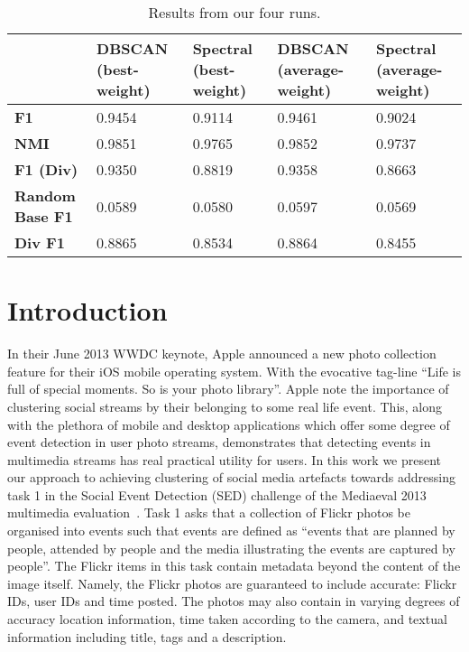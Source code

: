 \documentclass{../acm_proc_article-me11_tweaked}
\begin{document}
\begin{table*}[t!]
	\caption{\label{tab:results}Results from our four runs.}
\centering
    \begin{tabular}{|l||l|l|l|l|}
	\hline
    ~                  & \textbf{DBSCAN (best-weight)} &  \textbf{Spectral (best-weight)} & \textbf{DBSCAN (average-weight)} & \textbf{Spectral (average-weight)} \\
    \hline
    \hline
    \textbf{F1}                 & 0.9454        & 0.9114           & 0.9461           & 0.9024             \\
    \hline
    \textbf{NMI}                & 0.9851        & 0.9765           & 0.9852           & 0.9737             \\
    \hline
    \textbf{F1 (Div)}           & 0.9350        & 0.8819           & 0.9358           & 0.8663             \\
    \hline
    \textbf{Random Base F1} & 0.0589        & 0.0580           & 0.0597           & 0.0569             \\
    \hline
    \textbf{Div F1}             & 0.8865        & 0.8534           & 0.8864           & 0.8455             \\
	\hline
    \end{tabular}
\end{table*}
\section{Introduction}
In their June 2013 WWDC keynote, Apple announced a new photo collection feature for their iOS mobile operating system. With the evocative tag-line ``Life is full of special moments. So is your photo library''. Apple note the importance of clustering social streams by their belonging to some real life event. This, along with the plethora of mobile and desktop applications which offer some degree of event detection in user photo streams, demonstrates that detecting events in multimedia streams has real practical utility for users. %
In this work we present our approach to achieving clustering of social media artefacts towards addressing task 1 in the Social Event Detection (SED) challenge of the Mediaeval 2013 multimedia evaluation~\cite{SED2013}. Task 1 asks that a collection of Flickr photos be organised into events such that events are defined as ``events that are planned by people, attended by people and the media illustrating the events are captured by people''. The Flickr items in this task contain metadata beyond the content of the image itself. Namely, the Flickr photos are guaranteed to include accurate: Flickr IDs, user IDs and time posted. The photos may also contain in varying degrees of accuracy location information, time taken according to the camera, and textual information including title, tags and a description. 
\end{document}
